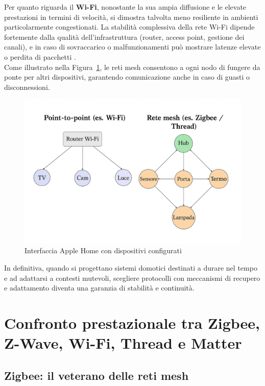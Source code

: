 Per quanto riguarda il \textbf{Wi-Fi}, nonostante la sua ampia diffusione e le elevate prestazioni in termini di velocità, si dimostra talvolta meno resiliente in ambienti particolarmente congestionati. La stabilità complessiva della rete Wi-Fi dipende fortemente dalla qualità dell'infrastruttura (router, access point, gestione dei canali), e in caso di sovraccarico o malfunzionamenti può mostrare latenze elevate o perdita di pacchetti \cite{wifi6-spec}.\\

Come illustrato nella Figura~\ref{fig:reti-mesh}, le reti mesh consentono a ogni nodo di fungere da ponte per altri dispositivi, garantendo comunicazione anche in caso di guasti o disconnessioni.



\begin{figure}[h!]
    \centering
    \includegraphics[scale=0.3]{immagini/reti.jpeg}
    \caption{Interfaccia Apple Home con dispositivi configurati}
    \label{fig:reti-mesh}
\end{figure}

In definitiva, quando si progettano sistemi domotici destinati a durare nel tempo e ad adattarsi a contesti mutevoli, scegliere protocolli con meccanismi di recupero e adattamento diventa una garanzia di stabilità e continuità.

\section{Confronto prestazionale tra Zigbee, Z-Wave, Wi-Fi, Thread e Matter}

\subsection{Zigbee: il veterano delle reti mesh}

